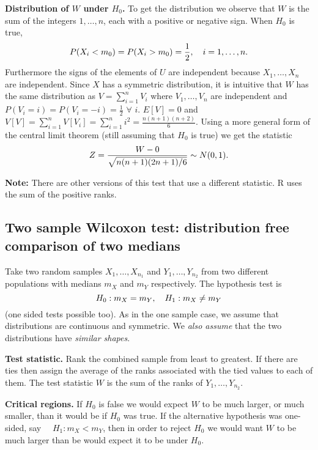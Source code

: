 \documentclass[10pt, two column]{article}
\begin{document}
{\bf Distribution of $W$ under $H_{0}$.} To get the distribution we observe that $W$ is the sum of the integers $1, \dots, n$, each with a positive or negative sign. When $H_{0}$ is true, \vspace{-6pt}
\[
P(X_{i} < m_{0}) = P(X_{i} > m_{0}) = \frac{1}{2}, \quad i = 1, \dots, n. \vspace{-6pt}
\]  
Furthermore the signs of the elements of $U$ are independent because $X_{1}, \dots, X_{n}$ are independent. Since $X$ has a symmetric distribution, it is intuitive that $W$ has the same distribution as $V = \sum_{i=1}^{n} V_{i}$ where $V_{1}, \dots, V_{n}$ are independent and $P(V_{i} = i) = P(V_{i} = -i) = \frac{1}{2}$ $\forall$ $i$. $E[V] = 0$ and $V[V] = \sum_{i=1}^{n} V[V_{i}] = \sum_{i=1}^{n} i^{2} = \frac{n(n+1)(n+2)}{6}$. Using a more general form of the central limit theorem (still assuming that $H_{0}$ is true) we get the statistic \vspace{-6pt}
\[
Z = \frac{W - 0}{\sqrt{n(n+1)(2n+1)/6}} \sim N(0,1). \vspace{-6pt}
\]

{\bf Note:} There are other versions of this test that use a different statistic. R uses the sum of the positive ranks. 

\subsection{Two sample Wilcoxon test: distribution free comparison of two medians}

Take two random samples $X_{1}, \dots, X_{n_{1}}$ and $Y_{1}, \dots, Y_{n_{2}}$ from two different populations with medians $m_{X}$ and $m_{Y}$ respectively. The hypothesis test is \vspace{-6pt}
\[
H_{0}: m_{X} = m_{Y}, \quad H_{1}: m_{X} \neq m_{Y} \vspace{-6pt}
\]
(one sided tests possible too). As in the one sample case, we assume that distributions are continuous and symmetric. We \emph{also assume} that the two distributions have \emph{similar shapes}. 

{\bf Test statistic.} Rank the combined sample from least to greatest. If there are ties then assign the average of the ranks associated with the tied values to each of them. The test statistic $W$ is the sum of the ranks of $Y_{1}, \dots, Y_{n_{2}}$.

{\bf Critical regions.} If $H_{0}$ is false we would expect $W$ to be much larger, or much smaller, than it would be if $H_{0}$ was true. If the alternative hypothesis was one-sided, say $\quad H_{1}: m_{X} < m_{Y}$, then in order to reject $H_{0}$ we would want $W$ to be much larger than be would expect it to be under $H_{0}$. 
\end{document}
